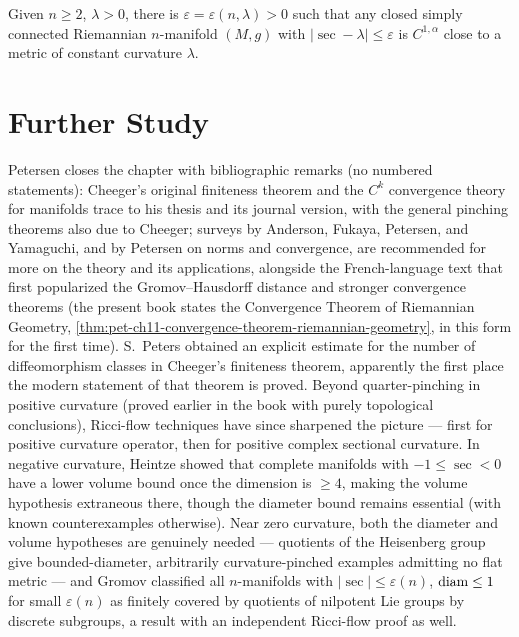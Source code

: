 \begin{corollary}
  \label{cor:pet-ch11-odd-dim-simply-connected-pinching}
  Given $n\ge2$, $\lambda>0$, there is $\varepsilon=\varepsilon(n,\lambda)>0$
  such that any closed simply connected Riemannian $n$-manifold $(M,g)$ with
  $|\sec-\lambda|\le\varepsilon$ is $C^{1,\alpha}$ close to a metric of
  constant curvature $\lambda$.
\end{corollary}

\section{Further Study}

Petersen closes the chapter with bibliographic remarks (no numbered
statements): Cheeger's original finiteness theorem and the $C^k$ convergence
theory for manifolds trace to his thesis and its journal version, with the
general pinching theorems also due to Cheeger; surveys by Anderson, Fukaya,
Petersen, and Yamaguchi, and by Petersen on norms and convergence, are
recommended for more on the theory and its applications, alongside the
French-language text that first popularized the Gromov--Hausdorff distance
and stronger convergence theorems (the present book states the Convergence
Theorem of Riemannian Geometry, \cref{thm:pet-ch11-convergence-theorem-riemannian-geometry},
in this form for the first time). S.\ Peters obtained an explicit estimate
for the number of diffeomorphism classes in Cheeger's finiteness theorem,
apparently the first place the modern statement of that theorem is proved.
Beyond quarter-pinching in positive curvature (proved earlier in the book
with purely topological conclusions), Ricci-flow techniques have since
sharpened the picture — first for positive curvature operator, then for
positive complex sectional curvature. In negative curvature, Heintze showed
that complete manifolds with $-1\le\sec<0$ have a lower volume bound once the
dimension is $\ge4$, making the volume hypothesis extraneous there, though
the diameter bound remains essential (with known counterexamples otherwise).
Near zero curvature, both the diameter and volume hypotheses are genuinely
needed — quotients of the Heisenberg group give bounded-diameter, arbitrarily
curvature-pinched examples admitting no flat metric — and Gromov classified
all $n$-manifolds with $|\sec|\le\varepsilon(n)$, $\operatorname{diam}\le1$ for small
$\varepsilon(n)$ as finitely covered by quotients of nilpotent Lie groups by
discrete subgroups, a result with an independent Ricci-flow proof as well.

